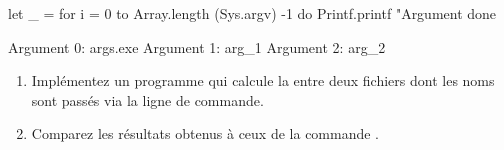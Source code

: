 \documentclass[a4paper, 10pt]{article}
\begin{document}
\begin{ocamlcode}
let _ = for i = 0 to Array.length (Sys.argv) -1 do
  Printf.printf "Argument %
done
\end{ocamlcode}
\begin{ocamlcode}
Argument 0: args.exe
Argument 1: arg_1
Argument 2: arg_2
\end{ocamlcode}
\begin{enumerate}[resume]
\item Implémentez un programme qui calcule la  entre deux fichiers dont les noms sont passés via la ligne de commande.
\item Comparez les résultats obtenus à ceux de la commande .
\end{enumerate}
\end{document}
